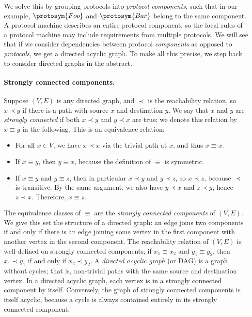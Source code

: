 \documentclass[../generics]{subfiles}
\begin{document}
We solve this by grouping protocols into \emph{protocol components}, such that in our example, $\protosym{Foo}$ and $\protosym{Bar}$ belong to the same component. A protocol machine describes an entire protocol component, so the local rules of a protocol machine may include requirements from multiple protocols. We will see that if we consider dependencies between protocol \emph{components} as opposed to \emph{protocols}, we get a directed acyclic graph. To make all this precise, we step back to consider directed graphs in the abstract.

\paragraph{Strongly connected components.}
Suppose $(V, E)$ is any directed graph, and $\prec$ is the reachability relation, so $x\prec y$ if there is a path with source $x$ and destination $y$. We say that $x$ and $y$ are \emph{strongly connected} if both $x\prec y$ and $y\prec x$ are true; we denote this relation by $x\equiv y$ in the following. This is an equivalence relation:
\begin{itemize}
\item For all $x\in V$, we have $x\prec x$ via the trivial path at $x$, and thus $x\equiv x$.
\item If $x\equiv y$, then $y\equiv x$, because the definition of $\equiv$ is symmetric.
\item If $x\equiv y$ and $y\equiv z$, then in particular $x\prec y$ and $y\prec z$, so $x\prec z$, because $\prec$ is transitive. By the same argument, we also have $y\prec x$ and $z\prec y$, hence $z\prec x$. Therefore, $x\equiv z$.
\end{itemize}

The equivalence classes of $\equiv$ are the \emph{strongly connected components} of $(V, E)$. We give this set the structure of a directed graph: an edge joins two components if and only if there is an edge joining some vertex in the first component with another vertex in the second component. The reachability relation of $(V, E)$ is well-defined on strongly connected components; if $x_1\equiv x_2$ and $y_1\equiv y_2$, then $x_1\prec y_1$ if and only if $x_2\prec y_2$. A \emph{directed acyclic graph} (or DAG) is a graph without cycles; that is, non-trivial paths with the same source and destination vertex. In a directed acyclic graph, each vertex is in a strongly connected component by itself. Conversely, the graph of strongly connected components is itself acyclic, because a cycle is always contained entirely in its strongly connected component.
\end{document}
